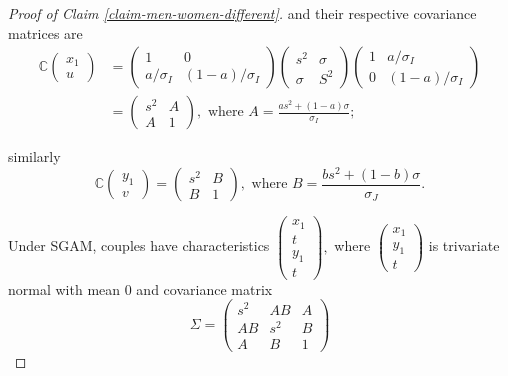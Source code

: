 \documentclass[
]{article}
\theoremstyle{definition}
\theoremstyle{definition}
\theoremstyle{definition}
\theoremstyle{definition}
\theoremstyle{remark}
\begin{document}
\begin{proof}[Proof of Claim \ref{claim-men-women-different}]
and their respective covariance matrices are
\begin{align*}
\mathbb{C}\left(\begin{array}{c}
x_{1}\\
u
\end{array}\right) & =\left(\begin{array}{cc}
1 & 0\\
a/\sigma_{I} & (1-a)/\sigma_{I}
\end{array}\right)\left(\begin{array}{cc}
s^{2} & \sigma\\
\sigma & S^{2}
\end{array}\right)\left(\begin{array}{cc}
1 & a/\sigma_{I}\\
0 & (1-a)/\sigma_{I}
\end{array}\right)\\
 & =\left(\begin{array}{cc}
s^{2} & A \\
A & 1
\end{array}\right), \textrm{ where } A=\frac{as^{2}+(1-a)\sigma}{\sigma_{I}};
\end{align*}

similarly
\[
\mathbb{C}\left(\begin{array}{c}
y_{1}\\
v
\end{array}\right)=\left(\begin{array}{cc}
s^{2} & B \\
B & 1
\end{array}\right), \textrm{ where } B=\frac{bs^{2}+(1-b)\sigma}{\sigma_{J}}.
\]

Under SGAM, couples have characteristics $\left(\begin{array}{c}
x_{1}\\
t\\
y_{1}\\
t
\end{array}\right),$ where $\left(\begin{array}{c}
x_{1}\\
y_{1}\\
t
\end{array}\right)$ is trivariate normal with mean 0 and covariance matrix
\[
\Sigma=\left(\begin{array}{ccc}
s^{2} & AB & A\\
AB & s^{2} & B\\
A & B & 1
\end{array}\right)
\]



\end{proof}
\end{document}
